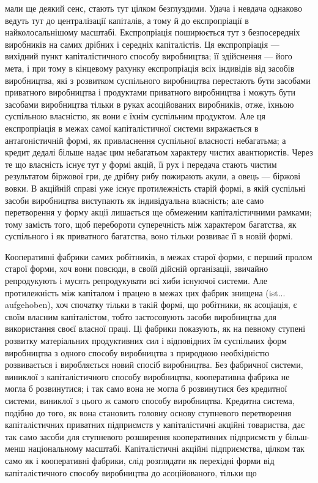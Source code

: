 мали ще деякий сенс, стають тут цілком безглуздими. Удача
і невдача однаково ведуть тут до централізації капіталів,
а тому й до експропріації в найколосальнішому масштабі. Експропріація поширюється тут з
безпосередніх виробників на
самих дрібних і середніх капіталістів. Ця експропріація — вихідний пункт капіталістичного способу
виробництва; її здійснення — його мета, і при тому в кінцевому рахунку експропріація всіх індивідів
від засобів виробництва, які з розвитком
суспільного виробництва перестають бути засобами приватного
виробництва і продуктами приватного виробництва і можуть
бути засобами виробництва тільки в руках асоційованих виробників, отже, їхньою суспільною власністю,
як вони є їхнім суспільним
продуктом. Але ця експропріація в межах самої капіталістичної
системи виражається в антагоністичній формі, як привласнення
суспільної власності небагатьма; а кредит дедалі більше надає
цим небагатьом характеру чистих авантюристів. Через те що
власність існує тут у формі акцій, її рух і передача стають
чистим результатом біржової гри, де дрібну рибу пожирають
акули, а овець — біржові вовки. В акційній справі уже існує
протилежність старій формі, в якій суспільні засоби виробництва
виступають як індивідуальна власність; але само перетворення
у форму акції лишається ще обмеженим капіталістичними рамками; тому замість того, щоб перебороти
суперечність між
характером багатства, як суспільного і як приватного багатства, воно тільки розвиває її в новій
формі.

Кооперативні фабрики самих робітників, в межах старої
форми, є перший пролом старої форми, хоч вони повсюди,
в своїй дійсній організації, звичайно репродукують і мусять
репродукувати всі хиби існуючої системи. Але протилежність між
капіталом і працею в межах цих фабрик знищена (ist... aufgehoben),
хоч спочатку тільки в такій формі, що робітники, як асоціація,
є своїм власним капіталістом, тобто застосовують засоби виробництва для використання своєї власної
праці. Ці фабрики показують, як на певному ступені розвитку матеріальних продуктивних сил і
відповідних їм суспільних форм виробництва з одного
способу виробництва з природною необхідністю розвивається і
виробляється новий спосіб виробництва. Без фабричної системи,
виниклої з капіталістичного способу виробництва, кооперативна фабрика не могла б розвинутися; і так
само вона не могла б
розвинутися без кредитної системи, виниклої з цього ж самого
способу виробництва. Кредитна система, подібно до того, як
вона становить головну основу ступневого перетворення капіталістичних приватних підприємств у
капіталістичні акційні товариства, дає так само засоби для ступневого розширення кооперативних
підприємств у більш-менш національному масштабі.
Капіталістичні акційні підприємства, цілком так само як і кооперативні фабрики, слід розглядати як
перехідні форми від капіталістичного способу виробництва до асоційованого, тільки що
